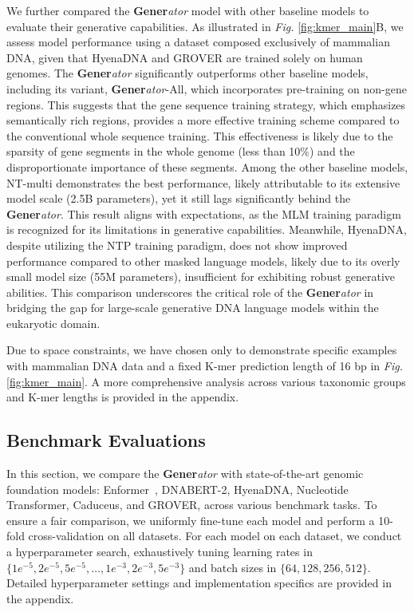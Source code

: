 We further compared the \textbf{Gener}\textit{ator} model with other baseline models to evaluate their generative capabilities. As illustrated in \textit{Fig.} \ref{fig:kmer_main}B, we assess model performance using a dataset composed exclusively of mammalian DNA, given that HyenaDNA and GROVER are trained solely on human genomes. The \textbf{Gener}\textit{ator} significantly outperforms other baseline models, including its variant, \textbf{Gener}\textit{ator}-All, which incorporates pre-training on non-gene regions. This suggests that the gene sequence training strategy, which emphasizes semantically rich regions, provides a more effective training scheme compared to the conventional whole sequence training. This effectiveness is likely due to the sparsity of gene segments in the whole genome (less than 10\%) and the disproportionate importance of these segments. Among the other baseline models, NT-multi demonstrates the best performance, likely attributable to its extensive model scale (2.5B parameters), yet it still lags significantly behind the \textbf{Gener}\textit{ator}. This result aligns with expectations, as the MLM training paradigm is recognized for its limitations in generative capabilities. Meanwhile, HyenaDNA, despite utilizing the NTP training paradigm, does not show improved performance compared to other masked language models, likely due to its overly small model size (55M parameters), insufficient for exhibiting robust generative abilities. This comparison underscores the critical role of the \textbf{Gener}\textit{ator} in bridging the gap for large-scale generative DNA language models within the eukaryotic domain.

Due to space constraints, we have chosen only to demonstrate specific examples with mammalian DNA data and a fixed K-mer prediction length of 16 bp in \textit{Fig.} \ref{fig:kmer_main}. A more comprehensive analysis across various taxonomic groups and K-mer lengths is provided in the appendix.

\subsection{Benchmark Evaluations}
In this section, we compare the \textbf{Gener}\textit{ator} with state-of-the-art genomic foundation models: Enformer~\cite{enformer}, DNABERT-2, HyenaDNA, Nucleotide Transformer, Caduceus, and GROVER, across various benchmark tasks. To ensure a fair comparison, we uniformly fine-tune each model and perform a 10-fold cross-validation on all datasets. For each model on each dataset, we conduct a hyperparameter search, exhaustively tuning learning rates in $\{1e^{-5}, 2e^{-5}, 5e^{-5}, \ldots, 1e^{-3}, 2e^{-3}, 5e^{-3}\}$ and batch sizes in $\{64, 128, 256, 512\}$. Detailed hyperparameter settings and implementation specifics are provided in the appendix.

